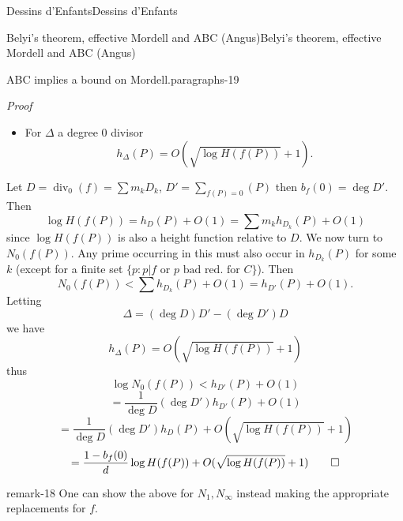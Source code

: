 \documentclass[10pt,]{book}
\makeatletter
\renewcommand*{\proofname}{Proof}
\renewenvironment{proof}[1][\proofname]{\par
  \pushQED{\qed}%
  \normalfont \topsep6\p@\@plus6\p@\relax
  \trivlist
  \item\relax
    {\itshape
    #1\@addpunct{.}}\hspace\labelsep\ignorespaces
}{%
  \popQED\endtrivlist\@endpefalse
}
\numberwithin{equation}{section}
\DeclareMathOperator{\divisor}{div}
\newcommand{\lt}{<}
\makeatother
\begin{document}
\begin{chapterptx}{Dessins d'Enfants}{}{Dessins d'Enfants}{}{}
\begin{sectionptx}{Belyi's theorem, effective Mordell and ABC (Angus)}{}{Belyi's theorem, effective Mordell and ABC (Angus)}{}{}
\begin{paragraphs}{ABC implies a bound on Mordell.}{paragraphs-19}
\begin{proof}
\begin{itemize}[label=\textbullet]
\begin{equation*}
D=  \sum m_k D_k
\end{equation*}
is a decomposition into irreducible divisors, then%
\begin{equation*}
h_D(P) = \sum m_k h_{D_k}(P)\text{.}
\end{equation*}
%
\item{}For \(\Delta\) a degree 0 divisor%
\begin{equation*}
h_{\Delta} (P) = O(\sqrt{\log H(f(P))} + 1)\text{.}
\end{equation*}
%
\end{itemize}
%
\par
\hypertarget{p-689}{}%
Let \(D = \divisor_0(f) = \sum m_k D_k\), \(D' = \sum_{f(P) = 0} (P)\) then \(b_f(0) = \deg D'\). Then%
\begin{equation*}
\log H(f(P)) = h_D(P) + O(1) = \sum m_k h_{D_k}(P) + O(1)
\end{equation*}
since \(\log H(f(P))\) is also a height function relative to \(D\). We now turn to \(N_0(f(P))\). Any prime occurring in this must also occur in \(h_{D_k}(P)\) for some \(k\) (except for a finite set \(\{p : p|f \text{ or } p \text{ bad red. for } C\}\)). Then%
\begin{equation*}
N_0(f(P))  \lt \sum h_{D_k}(P) + O(1) = h_{D'}(P) + O(1)\text{.}
\end{equation*}
Letting%
\begin{equation*}
\Delta = (\deg D) D' - (\deg D') D
\end{equation*}
we have%
\begin{equation*}
h_{\Delta} (P) = O(\sqrt{\log H(f(P))} + 1)
\end{equation*}
thus%
\begin{equation*}
\log N_0(f(P)) \lt h_{D'} (P) + O(1)
\end{equation*}
%
\begin{equation*}
= \frac{1}{\deg D} (\deg D') h_{D'} (P) + O(1)
\end{equation*}
%
\begin{equation*}
= \frac{1}{\deg D} (\deg D') h_{D} (P) + O(\sqrt{\log H(f(P))} + 1)
\end{equation*}
%
\begin{equation*}
= \frac{1- b_f(0)}{d} \log  H(f(P)) + O(\sqrt{\log H(f(P))} + 1)\qedhere
\end{equation*}
%
\end{proof}
\begin{remark}{}{remark-18}%
\hypertarget{p-690}{}%
One can show the above for \(N_1, N_\infty\) instead making the appropriate replacements for \(f\).%

\end{remark}
\end{paragraphs}
\end{sectionptx}
\end{chapterptx}
\end{document}
